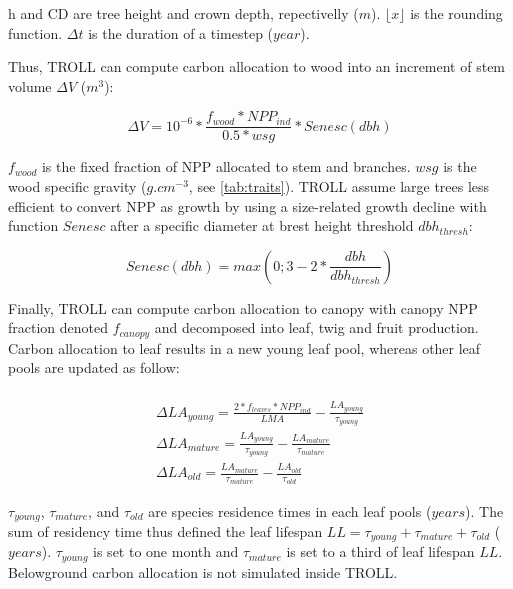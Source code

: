 \documentclass[12pt,]{article}
\theoremstyle{definition}
\theoremstyle{definition}
\theoremstyle{remark}
\begin{document}
h and CD are tree height and crown depth, repectivelly (\(m\)).
\(\lfloor x \rfloor\) is the rounding function. \(\Delta t\) is the
duration of a timestep (\(year\)).

Thus, TROLL can compute carbon allocation to wood into an increment of
stem volume \(\Delta V\) (\(m^3\)):

\begin{equation}
  \Delta V = 10^{-6} * \frac{f_{wood}*NPP_{ind}}{0.5*wsg}*Senesc(dbh)
  \label{eq:DeltaV}
\end{equation}

\(f_{wood}\) is the fixed fraction of NPP allocated to stem and
branches. \(wsg\) is the wood specific gravity (\(g.cm^{-3}\), see
\ref{tab:traits}). TROLL assume large trees less efficient to convert
NPP as growth by using a size-related growth decline with function
\(Senesc\) after a specific diameter at brest height threshold
\(dbh_{thresh}\):

\begin{equation}
  Senesc(dbh) = max(0;3-2*\frac{dbh}{dbh_{thresh}})
  \label{eq:Senesc}
\end{equation}

Finally, TROLL can compute carbon allocation to canopy with canopy NPP
fraction denoted \(f_{canopy}\) and decomposed into leaf, twig and fruit
production. Carbon allocation to leaf results in a new young leaf pool,
whereas other leaf pools are updated as follow:

\begin{equation}
  \begin{array}{c} \\
   \Delta LA_{young} = \frac{2*f_{leaves}*NPP_{ind}}{LMA}-\frac{LA_{young}}{\tau_{young}} \\
  \Delta LA_{mature} = \frac{LA_{young}}{\tau_{young}} - \frac{LA_{mature}}{\tau_{mature}}\\
  \Delta LA_{old} = \frac{LA_{mature}}{\tau_{mature}} - \frac{LA_{old}}{\tau_{old}}
  \end{array}
  \label{eq:DeltaLA}
\end{equation}

\(\tau_{young}\), \(\tau_{mature}\), and \(\tau_{old}\) are species
residence times in each leaf pools (\(years\)). The sum of residency
time thus defined the leaf lifespan
\(LL = \tau_{young} + \tau_{mature} + \tau_{old}\) (\(years\)).
\(\tau_{young}\) is set to one month and \(\tau_{mature}\) is set to a
third of leaf lifespan \(LL\). Belowground carbon allocation is not
simulated inside TROLL.
\end{document}
